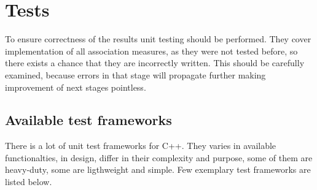 \chapter{Tests}
To ensure correctness of the results unit testing should be performed. They cover implementation of all association measures, 
as they were not tested before, so there exists a chance that they are incorrectly written. This should be carefully examined, 
because errors in that stage will propagate further making improvement of next stages pointless.

\section{Available test frameworks}
There is a lot of unit test frameworks for C++. They varies in available functionalties, in design, differ in their complexity and purpose, 
some of them are heavy-duty, some are ligthweight and simple. Few exemplary test frameworks are listed below.
